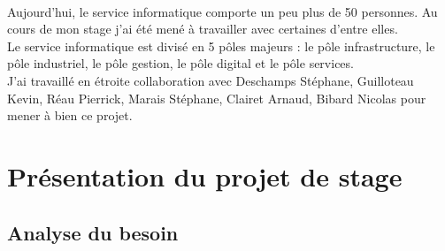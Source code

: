 \documentclass[a4paper,12pt]{extarticle}
\begin{document}
		\paragraph{}
			
	Aujourd’hui, le service informatique comporte un peu plus de 50 personnes. Au cours de mon stage j’ai été mené à travailler avec certaines d’entre elles.\\
Le service informatique est divisé en 5 pôles majeurs : le pôle infrastructure, le pôle industriel, le pôle gestion, le pôle digital et le pôle services.\\
J’ai travaillé en étroite collaboration avec Deschamps Stéphane, Guilloteau Kevin, Réau Pierrick, Marais Stéphane, Clairet Arnaud, Bibard Nicolas pour mener à bien ce projet.\\

	\clearpage
	
	\section{Présentation du projet de stage}
	
	\subsection{Analyse du besoin}
		\paragraph{}
			
\end{document}
